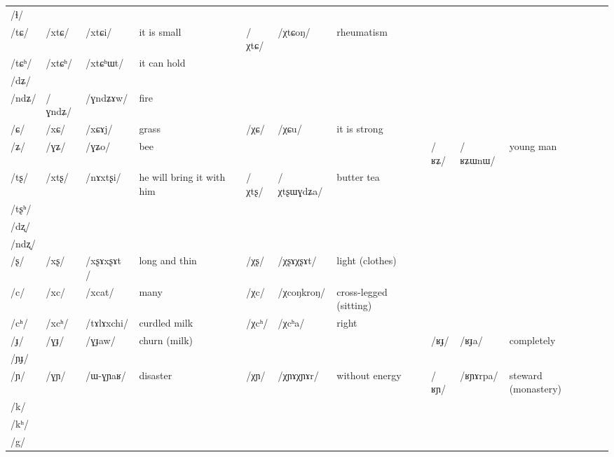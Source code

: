 \documentclass[oldfontcommands,oneside,a4paper,11pt]{article}
\newcommand{\ipa}[1]{/#1/} %
\newcommand{\deux}[1]{/#1/}
\newcommand{\tib}[1]{\cellcolor{lightgray}\textbf{#1}}
\newcommand{\idph}[1]{\cellcolor{gray}\textbf{#1}}
\begin{document}
\begin{table}
{\begin{tabular}{l|lll|lll|lll|l}
\ipa{ɬ} 	& 	  	& 	  	& 	  	& 	  	& 	  	& 	& 	  	& 	  	& 	 \\  
\ipa{tɕ}	& 	 \deux{xtɕ}	& 	 \ipa{xtɕi}	& 	 it is small 	& 	 \deux{χtɕ}  \tib{} 	& 	 \ipa{χtɕoŋ}	& 	rheumatism	&	&	& \\  	
\ipa{tɕʰ}	& 	 \deux{xtɕʰ}	& 	 \ipa{xtɕʰɯt}	& 	it can hold	& 	  	& 	  	& 	&	&	& \\  		
\ipa{dʑ} 	& 	  	& 	  	& 	  	& 	  	& 	  	& 	& 	  	& 	  	& 	 \\  
\ipa{ndʑ}	& 	 \deux{ɣndʑ}	& 	 \ipa{ɣndʑɤw}	& 	fire	& 	  	& 	  	& 	&	&	&	 \\  	
\ipa{ɕ}	& 	 \deux{xɕ}	& 	 \ipa{xɕɤj}	& 	grass	& 	 \deux{χɕ}	& 	 \ipa{χɕu}	& 	it is strong 	&	&	&\\  	
\ipa{ʑ}	& 	 \deux{ɣʑ}	& 	 \ipa{ɣʑo}	& 	bee	& 	&	&	& \ipa{ʁʑ}	&	 \ipa{ʁʑɯnɯ}	& 	young man \\  		
\ipa{tʂ}	& 	 \deux{xtʂ}	& 	 \ipa{nɤxtʂi}	& 	 he will bring it with him 	& 	 \deux{χtʂ}  \tib{}	& 	 \ipa{χtʂɯɣdʑa}	& 	butter tea 	&	&	&\\  	
\ipa{tʂʰ}	& 	  	& 	  	& 	  	& 	  	& 	  	& 	&	&	&	 \\  	
\ipa{dʐ}	& 	  	& 	  	& 	  	& 	  	& 	  	& 	&	&	&	 \\  	
\ipa{ndʐ}	& 	  	& 	  	& 	  	& 	  	& 	  	& 	&	&	&	 \\  	
\ipa{ʂ}	& 	 \deux{xʂ} \idph{}	& 	 \ipa{xʂɤxʂɤt }	& 	long and thin	& 	 \deux{χʂ} \idph{}	& 	 \ipa{χʂɤχʂɤt}	& 	light (clothes)	&	&	& \\  	
\ipa{c}	& 	 \deux{xc}	& 	 \ipa{xcat}	& 	many	& 	 \deux{χc} \tib{}	& 	 \ipa{χcoŋkroŋ}	& 	 cross-legged (sitting) 	&	&	&\\  	
\ipa{cʰ}	& 	 \deux{xcʰ}	& 	 \ipa{tɤlɤxchi}	& 	curdled milk	& 	 \deux{χcʰ}	& 	 \ipa{χcʰa}	& 	 right 	&	&	&\\  	
\ipa{ɟ}	& 	 \deux{ɣɟ}	& 	 \ipa{ɣɟaw}	& 	 churn (milk) 	& 	&	&	&	 \deux{ʁɟ}	& 	  \ipa{ʁɟa}	& 	completely  \\  	
\ipa{ɲɟ}	& 	  	& 	  	& 	  	& 	  	& 	  	& 	& 	  	& 	  	& 	 \\  
\ipa{ɲ}	& 	 \deux{ɣɲ}	& 	 \ipa{ɯ-ɣɲaʁ}	& 	 disaster 	& 	\deux{χɲ} \idph{}	& \ipa{χɲɤχɲɤr}	& without energy 	& \deux{ʁɲ}\tib{}	& 	 \ipa{ʁɲɤrpa}	& 	steward (monastery) \\  	
\ipa{k}	& 	  	& 	  	& 	  	& 	  	& 	  	& 	& 	  	& 	  	& 	 \\  
\ipa{kʰ}	& 	  	& 	  	& 	  	& 	  	& 	  	& 	& 	  	& 	  	& 	 \\  
\ipa{g} 	& 	  	& 	  	& 	  	& 	  	& 	  	& 	& 	  	& 	  	& 	 \\  

\end{tabular}}
\end{table}
\end{document}
